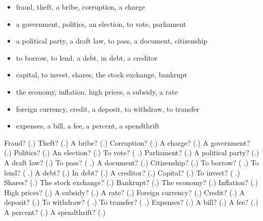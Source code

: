 \begin{itemize}
\raggedright
  \item fraud, theft, a bribe, corruption, a charge
  \item a government, politics, an election, to vote, parliament
  \item a political party, a draft law, to pass, a document, citizenship
  \item to borrow, to lend, a debt, in debt, a creditor
  \item capital, to invest, shares, the stock exchange, bankrupt
  \item the economy, inflation, high prices, a subsidy, a rate
  \item foreign currency, credit, a deposit, to withdraw, to transfer
  \item expenses, a bill, a fee, a percent, a spendthrift
\end{itemize}

\begin{tcolorbox}[breakable,colback=teal!4,colframe=teal!35!black,title={Before you move on}]
Fraud? (\textbf{}.) Theft? (\textbf{}.) A bribe? (\textbf{}.) Corruption? (\textbf{}.) A charge? (\textbf{}.) A government? (\textbf{}.) Politics? (\textbf{}.) An election? (\textbf{}.) To vote? (\textbf{ }.) Parliament? (\textbf{}.) A political party? (\textbf{}.) A draft law? (\textbf{}.) To pass? (\textbf{ }.) A document? (\textbf{}.) Citizenship? (\textbf{}.) To borrow? (\textbf{ }.) To lend? (\textbf{ }.) A debt? (\textbf{}.) In debt? (\textbf{}.) A creditor? (\textbf{}.) Capital? (\textbf{}.) To invest? (\textbf{  }.) Shares? (\textbf{}.) The stock exchange? (\textbf{}.) Bankrupt? (\textbf{}.) The economy? (\textbf{}.) Inflation? (\textbf{}.) High prices? (\textbf{}.) A subsidy? (\textbf{}.) A rate? (\textbf{}.) Foreign currency? (\textbf{}.) Credit? (\textbf{}.) A deposit? (\textbf{}.) To withdraw? (\textbf{ }.) To transfer? (\textbf{ }.) Expenses? (\textbf{}.) A bill? (\textbf{}.) A fee? (\textbf{}.) A percent? (\textbf{}.) A spendthrift? (\textbf{}.)
\end{tcolorbox}

